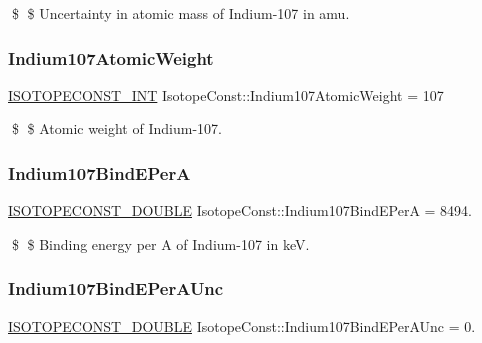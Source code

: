 \$ \$ Uncertainty in atomic mass of Indium-\/107 in amu. \mbox{\label{group___isotope_const-_indium-_in107_ga16b942c3bc292ff6b66d2afab197c1ca}} 
\subsubsection{\texorpdfstring{Indium107\+Atomic\+Weight}{Indium107AtomicWeight}}
{\footnotesize\ttfamily \mbox{\hyperlink{group___isotope_const-_macros_ga5f18360b3e99483a35c32d789e62621c}{I\+S\+O\+T\+O\+P\+E\+C\+O\+N\+S\+T\+\_\+\+I\+NT}} Isotope\+Const\+::\+Indium107\+Atomic\+Weight = 107}

\$ \$ Atomic weight of Indium-\/107. \mbox{\label{group___isotope_const-_indium-_in107_gac9a52c53925d72029847f3d1cd7e4387}} 
\subsubsection{\texorpdfstring{Indium107\+Bind\+E\+PerA}{Indium107BindEPerA}}
{\footnotesize\ttfamily \mbox{\hyperlink{group___isotope_const-_macros_ga8f45a7272ce02c0b4c65c44636ed719a}{I\+S\+O\+T\+O\+P\+E\+C\+O\+N\+S\+T\+\_\+\+D\+O\+U\+B\+LE}} Isotope\+Const\+::\+Indium107\+Bind\+E\+PerA = 8494.}

\$ \$ Binding energy per A of Indium-\/107 in keV. \mbox{\label{group___isotope_const-_indium-_in107_ga3b2fa7791f77e510d0b8fe4bac0fe827}} 
\subsubsection{\texorpdfstring{Indium107\+Bind\+E\+Per\+A\+Unc}{Indium107BindEPerAUnc}}
{\footnotesize\ttfamily \mbox{\hyperlink{group___isotope_const-_macros_ga8f45a7272ce02c0b4c65c44636ed719a}{I\+S\+O\+T\+O\+P\+E\+C\+O\+N\+S\+T\+\_\+\+D\+O\+U\+B\+LE}} Isotope\+Const\+::\+Indium107\+Bind\+E\+Per\+A\+Unc = 0.}

